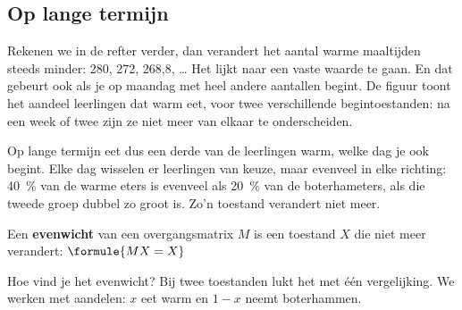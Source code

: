 \subsection{Op lange termijn}

Rekenen we in de refter verder, dan verandert het aantal warme maaltijden steeds minder: 280, 272, 268,8, \ldots{} Het lijkt naar een vaste waarde te gaan. En dat gebeurt ook als je op maandag met heel andere aantallen begint. De figuur toont het aandeel leerlingen dat warm eet, voor twee verschillende begintoestanden: na een week of twee zijn ze niet meer van elkaar te onderscheiden.


Op lange termijn eet dus een derde van de leerlingen warm, welke dag je ook begint. Elke dag wisselen er leerlingen van keuze, maar evenveel in elke richting: 40~\% van de warme eters is evenveel als 20~\% van de boterhameters, als die tweede groep dubbel zo groot is. Zo'n toestand verandert niet meer.

\begin{theorie}
Een \textbf{\textcolor{accent}{evenwicht}} van een overgangsmatrix $M$ is een toestand $X$ die niet meer verandert: \quad $\formule{MX = X}$
\end{theorie}

Hoe vind je het evenwicht? Bij twee toestanden lukt het met één vergelijking. We werken met aandelen: $x$ eet warm en $1 - x$ neemt boterhammen.

